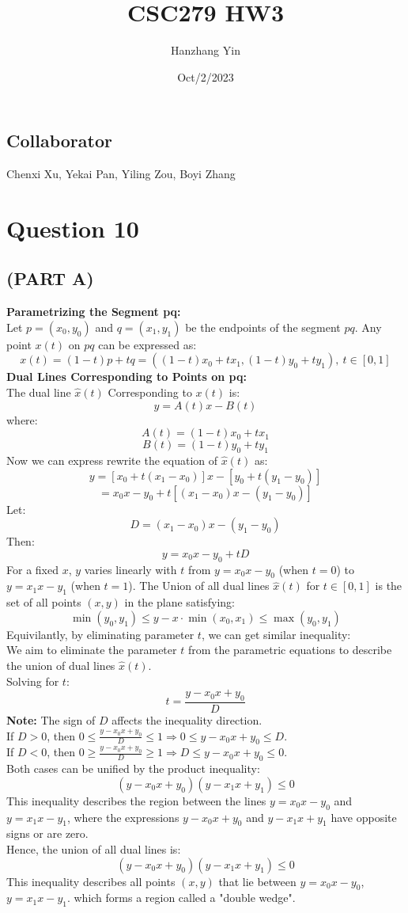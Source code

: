 \documentclass{article}
\title{CSC279 HW3}
\author{Hanzhang Yin}
\date{Oct/2/2023}
\begin{document}
\maketitle

\subsection*{Collaborator}
Chenxi Xu, Yekai Pan, Yiling Zou, Boyi Zhang

\section*{Question 10}

\subsection*{(PART A)}
\textbf{Parametrizing the Segment pq: }
\\
Let $p = (x_0, y_0)$ and $q = (x_1, y_1)$ be the endpoints of the segment $pq$. Any point $x(t)$ on $pq$ can 
be expressed as: 
\[ x(t) = (1 - t)p + tq = ((1 - t)x_0 + tx_1, (1 - t)y_0 + ty_1), \ t \in [0, 1] \]
\textbf{Dual Lines Corresponding to Points on pq: }
\\
The dual line $\hat{x}(t)$ Corresponding to $x(t)$ is:
\[ y = A(t)x - B(t) \]
where:
\[ A(t) = (1 - t)x_0 + tx_1 \]
\[ B(t) = (1 - t)y_0 + ty_1 \]
Now we can express rewrite the equation of $\hat{x}(t)$ as:
\[ y = [x_0 + t(x_1 - x_0)]x - [y_0 + t(y_1 - y_0)] \]
\[ = x_0x - y_0 + t[(x_1 - x_0)x - (y_1 - y_0)] \]
Let:
\[ D = (x_1 - x_0)x - (y_1 - y_0) \]
Then:
\[ y = x_0x - y_0 + tD \]
For a fixed $x$, $y$ varies linearly with $t$ from $y = x_0x - y_0$ (when $t = 0$) to $y = x_1x - y_1$ (when $t = 1$).
The Union of all dual lines $\hat{x}(t)$ for $t \in [0,1]$ is the set of all points $(x, y)$ in the plane satisfying:
\[ \min(y_0, y_1) \leq y - x \cdot \min(x_0, x_1) \leq \max(y_0, y_1) \]
Equivilantly, by eliminating parameter $t$, we can get similar inequality:
\\
We aim to eliminate the parameter \( t \) from the parametric equations to describe the union of dual lines \(\hat{x}(t)\).
\\
Solving for \( t \):
\[
t = \frac{y - x_0 x + y_0}{D}
\]
\textbf{Note:} The sign of \( D \) affects the inequality direction.
\\
If \( D > 0 \), then \( 0 \leq \frac{y - x_0 x + y_0}{D} \leq 1 \Rightarrow 0 \leq y - x_0 x + y_0 \leq D \).
\\
If \( D < 0 \), then \( 0 \geq \frac{y - x_0 x + y_0}{D} \geq 1 \Rightarrow D \leq y - x_0 x + y_0 \leq 0 \).
\\
Both cases can be unified by the product inequality:
\[ (y - x_0 x + y_0)(y - x_1 x + y_1) \leq 0 \]
This inequality describes the region between the lines \( y = x_0 x - y_0 \) and \( y = x_1 x - y_1 \), where the expressions \( y - x_0 x + y_0 \) and \( y - x_1 x + y_1 \) have opposite signs or are zero.
\\
Hence, the union of all dual lines is:
\[ (y - x_0 x + y_0)(y - x_1 x + y_1) \leq 0 \]
This inequality describes all points $(x, y)$ that lie between $y = x_0x - y_0$, $y = x_1x - y_1$. 
which forms a region called a "double wedge".
\end{document}
